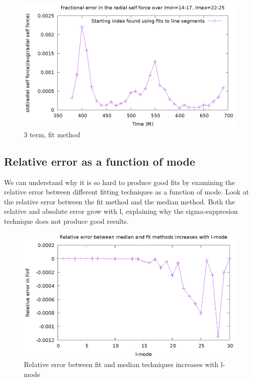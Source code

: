 \documentclass{article}
\begin{document}
\begin{figure}
  \includegraphics{fractionalErrorOverTimeFits}
  \caption{3 term, fit method}
\end{figure}

\subsection{Relative error as a function of mode}
We can understand why it is so hard to produce good fits by examining the relative error between different fitting techniques as a function of mode. Look at the relative error between the fit method and the median method. Both the relative and absolute error grow with l, explaining why the sigma-suppresion technique does not produce good results.

\begin{figure}
  \includegraphics{relErrorIncreaseslMode}
  \caption{Relative error between fit and median techniques increases with l-mode}
\end{figure}
\end{document}
